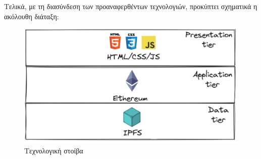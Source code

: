 Τελικά, με τη διασύνδεση των προαναφερθέντων τεχνολογιών, προκύπτει σχηματικά η ακόλουθη διάταξη:

\begin{figure}[H]
    \centering
    \includegraphics[width=.75\textwidth]{assets/figures/chapter-3/3.2.technology.stack}
    \caption{Τεχνολογική στοίβα}
\end{figure}
